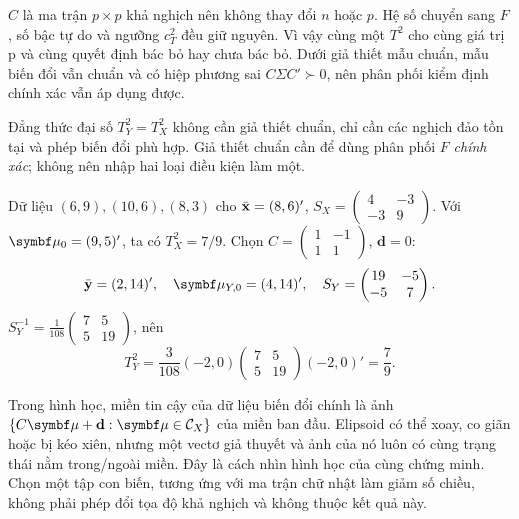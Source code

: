 $C$ là ma trận $p\times p$ khả nghịch nên không thay đổi $n$ hoặc $p$.
Hệ số chuyển sang $F$, số bậc tự do và ngưỡng $c_T^2$ đều giữ nguyên.
Vì vậy cùng một $T^2$ cho cùng giá trị p và cùng quyết định bác bỏ hay
chưa bác bỏ. Dưới giả thiết mẫu chuẩn, mẫu biến đổi vẫn chuẩn và có
hiệp phương sai $C\Sigma C'\succ0$, nên phân phối kiểm định chính xác
vẫn áp dụng được.


Đẳng thức đại số $T_Y^2=T_X^2$ không cần giả thiết chuẩn, chỉ cần các
nghịch đảo tồn tại và phép biến đổi phù hợp. Giả thiết chuẩn cần để dùng
phân phối $F$ \emph{chính xác}; không nên nhập hai loại điều kiện làm một.

\begin{example}
Dữ liệu $(6,9),(10,6),(8,3)$ cho
$\bar{\mathbf x}=(8,6)'$, $S_X=\begin{pmatrix}4&-3\\-3&9\end{pmatrix}$.
Với $\vmu_0=(9,5)'$, ta có $T_X^2=7/9$.
Chọn $C=\begin{pmatrix}1&-1\\1&1\end{pmatrix}$, $\mathbf d=0$:
\[
 \bar{\mathbf y}=(2,14)',\quad\vmu_{Y,0}=(4,14)',\quad
 S_Y=\begin{pmatrix}19&-5\\-5&7\end{pmatrix}.
\]
$S_Y^{-1}=\frac1{108}\begin{pmatrix}7&5\\5&19\end{pmatrix}$, nên
\[
 T_Y^2=\frac3{108}(-2,0)
 \begin{pmatrix}7&5\\5&19\end{pmatrix}(-2,0)'=\frac79.
\]
\end{example}


Trong hình học, miền tin cậy của dữ liệu biến đổi chính là ảnh
$\{C\vmu+\mathbf d:\vmu\in\mathcal C_X\}$ của miền ban đầu.
Elipsoid có thể xoay, co giãn hoặc bị kéo xiên, nhưng một vectơ giả
thuyết và ảnh của nó luôn có cùng trạng thái nằm trong/ngoài miền.
Đây là cách nhìn hình học của cùng chứng minh.
Chọn một tập con biến, tương ứng với ma trận chữ nhật làm giảm số
chiều, không phải phép đổi tọa độ khả nghịch và không thuộc kết quả này.

